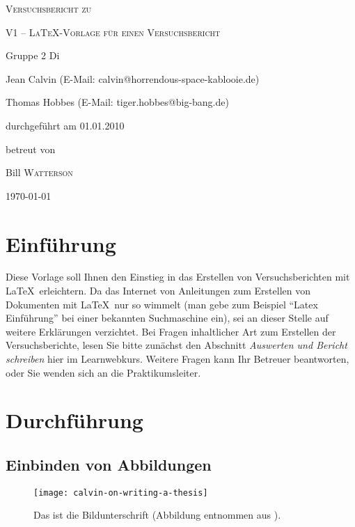 \documentclass[11pt,a4paper,titlepage]{article}
\begin{document}
\begin{titlepage}
	\centering
	{\scshape\LARGE Versuchsbericht zu \par}
	\vspace{1cm}
	{\scshape\huge V1 -- \LaTeX-Vorlage für einen Versuchsbericht\par}
	\vspace{2.5cm}
	{\LARGE Gruppe 2 Di\par}
	\vspace{0.5cm}
	{\large Jean Calvin (E-Mail: calvin@horrendous-space-kablooie.de) \par}
	{\large Thomas Hobbes (E-Mail: tiger.hobbes@big-bang.de) \par}
	\vfill
	durchgeführt am 01.01.2010\par
	betreut von\par
	{\large Bill \textsc{Watterson}}

	\vfill

	{\large \today\par}
\end{titlepage}


\tableofcontents

\newpage

\section{Einführung}

Diese Vorlage soll Ihnen den Einstieg in das Erstellen von Versuchsberichten mit \LaTeX\ erleichtern. Da das Internet von Anleitungen zum Erstellen von Dokumenten mit \LaTeX\ nur so wimmelt (man gebe zum Beispiel ``Latex Einführung'' bei einer bekannten Suchmaschine ein), sei an dieser Stelle auf weitere Erklärungen verzichtet. Bei Fragen inhaltlicher Art zum Erstellen der Versuchsberichte, lesen Sie bitte zunächst den Abschnitt \emph{Auswerten und Bericht schreiben} hier im Learnwebkurs. Weitere Fragen kann Ihr Betreuer beantworten, oder Sie wenden sich an die Praktikumsleiter.

\section{Durchführung}

\subsection{Einbinden von Abbildungen}

\begin{figure}[htb]
  \centering
    \texttt{[image: calvin-on-writing-a-thesis]} %
  \caption{Das ist die Bildunterschrift (Abbildung entnommen aus \cite{billwatterson}).}\label{CandH}
\end{figure}
\end{document}
